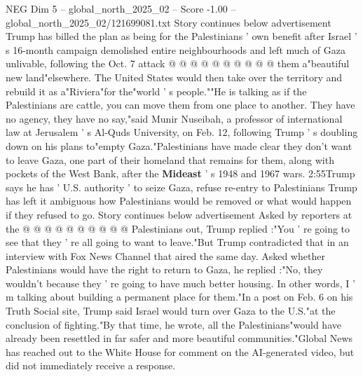 \begin{textsample}{NEG Dim 5 – global\_north\_2025\_02 – Score -1.00 – global\_north\_2025\_02/121699081.txt}
Story continues below advertisement Trump has billed the plan as being for the Palestinians ' own benefit after Israel ' s 16-month campaign demolished entire neighbourhoods and left much of Gaza unlivable, following the Oct. 7 attack @ @ @ @ @ @ @ @ @ @ them a"beautiful new land"elsewhere.
The United States would then take over the territory and rebuild it as a"Riviera"for the"world ' s people.""He is talking as if the Palestinians are cattle, you can move them from one place to another.
They have no agency, they have no say,"said Munir Nuseibah, a professor of international law at Jerusalem ' s Al-Quds University, on Feb. 12, following Trump ' s doubling down on his plans to"empty Gaza."Palestinians have made clear they don't want to leave Gaza, one part of their homeland that remains for them, along with pockets of the West Bank, after the \textbf{Mideast} ' s 1948 and 1967 wars. 2:55Trump says he has ' U.S. authority ' to seize Gaza, refuse re-entry to Palestinians Trump has left it ambiguous how Palestinians would be removed or what would happen if they refused to go.
Story continues below advertisement Asked by reporters at the @ @ @ @ @ @ @ @ @ @ Palestinians out, Trump replied :"You ' re going to see that they ' re all going to want to leave."But Trump contradicted that in an interview with Fox News Channel that aired the same day.
Asked whether Palestinians would have the right to return to Gaza, he replied :"No, they wouldn't because they ' re going to have much better housing.
In other words, I ' m talking about building a permanent place for them."In a post on Feb. 6 on his Truth Social site, Trump said Israel would turn over Gaza to the U.S."at the conclusion of fighting."By that time, he wrote, all the Palestinians"would have already been resettled in far safer and more beautiful communities."Global News has reached out to the White House for comment on the AI-generated video, but did not immediately receive a response.

\end{textsample}

